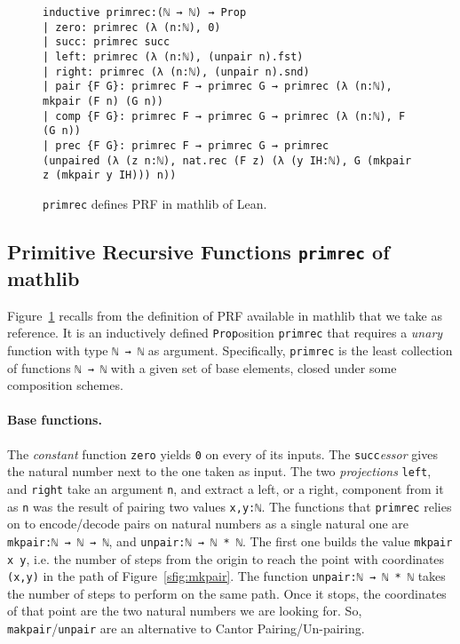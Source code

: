 \documentclass[runningheads]{llncs}
\newcommand{\PRF}{\textsf{PRF}\xspace}
\newcommand{\MATHLIB}{\textsf{mathlib}\xspace}
\newcommand{\LEAN}{\textsf{Lean}\xspace}
\begin{document}
\begin{figure}
\begin{lstlisting}[basicstyle=\small]
inductive primrec:(ℕ → ℕ) → Prop
| zero: primrec (λ (n:ℕ), 0)
| succ: primrec succ
| left: primrec (λ (n:ℕ), (unpair n).fst)
| right: primrec (λ (n:ℕ), (unpair n).snd)
| pair {F G}: primrec F → primrec G → primrec (λ (n:ℕ), mkpair (F n) (G n))
| comp {F G}: primrec F → primrec G → primrec (λ (n:ℕ), F (G n))
| prec {F G}: primrec F → primrec G → primrec
(unpaired (λ (z n:ℕ), nat.rec (F z) (λ (y IH:ℕ), G (mkpair z (mkpair y IH))) n))
\end{lstlisting}
\caption{\lstinline|primrec| defines \PRF in \MATHLIB of \LEAN.}
\label{fig: primrec}
\end{figure}


\subsection{Primitive Recursive Functions {\normalfont \lstinline|primrec|} of \MATHLIB }
\label{section:Unary Primitive Recursive Functions}

Figure~\ref{fig: primrec} recalls from \cite{Carneiro-primrecMathlib} the definition of \PRF available in \MATHLIB that we take as reference. It is an inductively defined \lstinline|Prop|osition \lstinline|primrec| that requires a \emph{unary} function with type \lstinline|ℕ → ℕ| as argument. Specifically, \lstinline|primrec| is the least collection of functions \lstinline|ℕ → ℕ| with a given set of base elements, closed under some composition schemes.

\paragraph{Base functions.}
The \emph{constant} function \lstinline|zero| yields \lstinline|0| on every of its inputs.
The \lstinline|succ|\emph{essor} gives the natural number next to the one taken as input.
The two \emph{projections} \lstinline|left|, and \lstinline|right| take an argument \lstinline|n|, and extract a left, or a right, component from it as \lstinline|n| was the result of pairing two values \lstinline|x,y:ℕ|. The functions that \lstinline|primrec| relies on to encode/decode pairs on natural numbers as a single natural one are \lstinline|mkpair:ℕ → ℕ → ℕ|, and \lstinline|unpair:ℕ → ℕ * ℕ|. The first one builds the value \lstinline|mkpair x y|, i.e. the number of steps from the origin to reach the point with coordinates \lstinline|(x,y)| in the path of Figure~\ref{sfig:mkpair}. The function \lstinline|unpair:ℕ → ℕ * ℕ| takes the number of steps to perform on the same path. Once it stops, the coordinates of that point are the two natural numbers we are looking for. So, \lstinline|makpair|/\lstinline|unpair| are an alternative to Cantor Pairing/Un-pairing.
\end{document}
